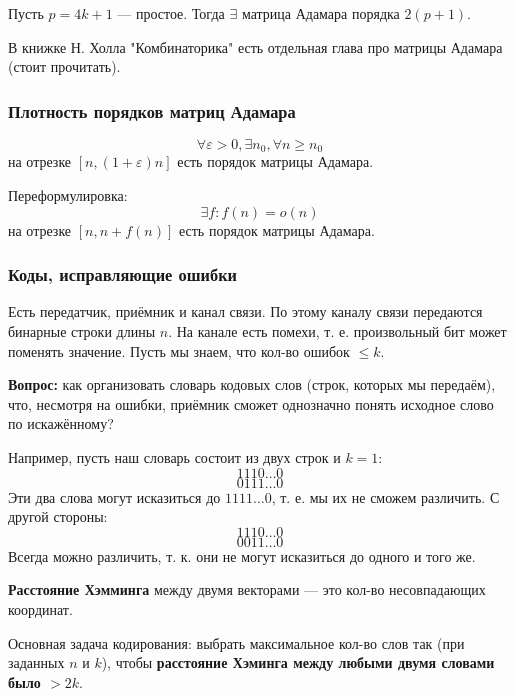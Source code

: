 \begin{theorem}
\label{theorem:02_4}
Пусть $p = 4k + 1$ --- простое. Тогда $\exists$ матрица Адамара порядка $2(p + 1)$.
\end{theorem}
\begin{note}
В книжке Н. Холла "Комбинаторика" есть отдельная глава про матрицы Адамара (стоит прочитать).
\end{note}
\subsubsection{Плотность порядков матриц Адамара}
\begin{theorem}
\label{theorem:02_5}
  \[
  \forall \varepsilon > 0, \exists n_0, \forall n \geq n_0 
  \]
 на отрезке $[n, (1 + \varepsilon)n]$ есть порядок матрицы Адамара.

 Переформулировка:
 \[
  \exists f \colon f(n) = o(n)
 \]
 на отрезке $[n, n + f(n)]$ есть порядок матрицы Адамара.
\end{theorem}
\subsubsection{Коды, исправляющие ошибки}

  Есть передатчик, приёмник и канал связи. По этому каналу связи передаются бинарные строки длины $n$. На канале есть помехи, т. е. произвольный бит может поменять значение. Пусть мы знаем, что кол-во ошибок $\leq k$. 

\textbf{Вопрос:} как организовать словарь кодовых слов (строк, которых мы передаём), что, несмотря на ошибки, приёмник сможет однозначно понять исходное слово по искажённому?

  Например, пусть наш словарь состоит из двух строк и $k = 1$:
  \[
    1110\ldots 0
  \]
  \[
    0111\ldots 0
  \]
  Эти два слова могут исказиться до $1111\ldots 0$, т. е. мы их не сможем различить. С другой стороны:
  \[
    1110\ldots 0
  \]
  \[
    0011\ldots 0
  \]
  Всегда можно различить, т. к. они не могут исказиться до одного и того же.

\begin{definition}
  \textbf{Расстояние Хэмминга} между двумя векторами --- это кол-во несовпадающих координат.
\end{definition}

  Основная задача кодирования: выбрать максимальное кол-во слов так (при заданных $n$ и $k$), чтобы \textbf{расстояние Хэминга между любыми двумя словами было $> 2k$}.

